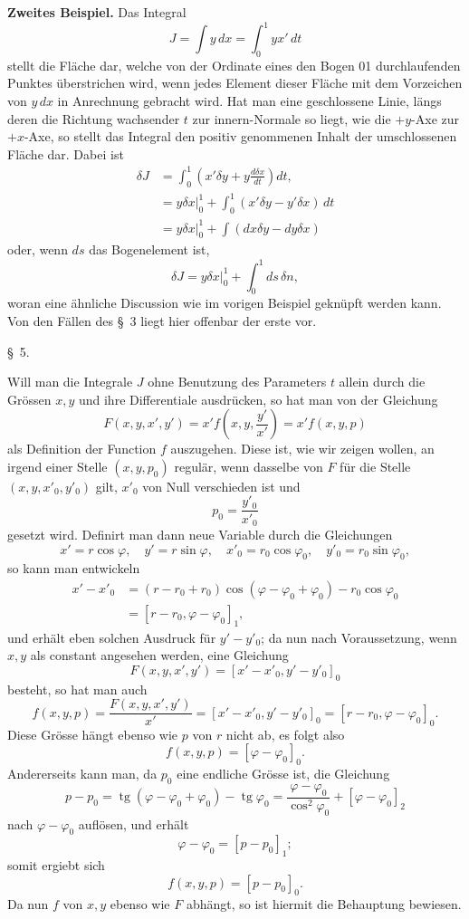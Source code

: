 \documentclass[11pt,a4paper,leqno]{article}
\begin{document}
\medskip
\noindent\textbf{Zweites Beispiel.} Das Integral
\[
J=\int y\,dx=\int_0^1yx'\,dt
\]
stellt die Fläche dar, welche von der Ordinate eines den Bogen 01 durchlaufenden Punktes überstrichen wird, wenn jedes Element dieser Fläche mit dem Vorzeichen von \(y\,dx\) in Anrechnung gebracht wird. Hat man eine geschlossene Linie, längs deren die Richtung wachsender \(t\) zur innern-Normale so liegt, wie die \(+y\)-Axe zur \(+x\)-Axe, so stellt das Integral den positiv genommenen Inhalt der umschlossenen Fläche dar. Dabei ist
\[
\begin{aligned}
\delta J
&=\int_0^1\left(x'\delta y+y\frac{d\delta x}{dt}\right)dt,\\
&=y\delta x\bigg|_0^1+\int_0^1(x'\delta y-y'\delta x)\,dt\\
&=y\delta x\bigg|_0^1+\int(dx\delta y-dy\delta x)
\end{aligned}
\]
oder, wenn \(ds\) das Bogenelement ist,
\[
\delta J=y\delta x\bigg|_0^1+\int_0^1ds\,\delta n,
\]
woran eine ähnliche Discussion wie im vorigen Beispiel geknüpft werden kann. Von den Fällen des \S~3 liegt hier offenbar der erste vor.

\begin{center}
\S~5.
\end{center}

Will man die Integrale \(J\) ohne Benutzung des Parameters \(t\) allein durch die Grössen \(x,y\) und ihre Differentiale ausdrücken, so hat man von der Gleichung
\[
F(x,y,x',y')=x'f\left(x,y,\frac{y'}{x'}\right)=x'f(x,y,p)
\]
als Definition der Function \(f\) auszugehen. Diese ist, wie wir
zeigen wollen, an irgend einer Stelle \((x,y,p_0)\) regulär, wenn dasselbe von \(F\) für die Stelle \((x,y,x'_0,y'_0)\) gilt, \(x'_0\) von Null verschieden ist und
\[
p_0=\frac{y'_0}{x'_0}
\]
gesetzt wird. Definirt man dann neue Variable durch die Gleichungen
\[
x'=r\cos\varphi,\quad y'=r\sin\varphi,\quad x'_0=r_0\cos\varphi_0,\quad y'_0=r_0\sin\varphi_0,
\]
so kann man entwickeln
\[
\begin{aligned}
x'-x'_0&=(r-r_0+r_0)\cos(\varphi-\varphi_0+\varphi_0)-r_0\cos\varphi_0\\
&=[r-r_0,\varphi-\varphi_0]_1,
\end{aligned}
\]
und erhält eben solchen Ausdruck für \(y'-y'_0\); da nun nach Voraussetzung, wenn \(x,y\) als constant angesehen werden, eine Gleichung
\[
F(x,y,x',y')=[x'-x'_0,y'-y'_0]_0
\]
besteht, so hat man auch
\[
f(x,y,p)=\frac{F(x,y,x',y')}{x'}=[x'-x'_0,y'-y'_0]_0=[r-r_0,\varphi-\varphi_0]_0.
\]
Diese Grösse hängt ebenso wie \(p\) von \(r\) nicht ab, es folgt also
\[
f(x,y,p)=[\varphi-\varphi_0]_0.
\]
Andererseits kann man, da \(p_0\) eine endliche Grösse ist, die Gleichung
\[
p-p_0=\operatorname{tg}(\varphi-\varphi_0+\varphi_0)-\operatorname{tg}\varphi_0
=\frac{\varphi-\varphi_0}{\cos^2\varphi_0}+[\varphi-\varphi_0]_2
\]
nach \(\varphi-\varphi_0\) auflösen, und erhält
\[
\varphi-\varphi_0=[p-p_0]_1;
\]
somit ergiebt sich
\[
f(x,y,p)=[p-p_0]_0.
\]
Da nun \(f\) von \(x,y\) ebenso wie \(F\) abhängt, so ist hiermit die Behauptung bewiesen.
\end{document}
